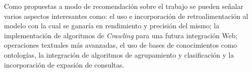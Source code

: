 Como propuestas a modo de recomendación sobre el trabajo se pueden señalar
varios aspectos interesantes como: el uso e incorporación de retroalimentación
al modelo con la cual se ganaría en rendimiento y precisión del mismo; la
implementación de algoritmos de \emph{Crawling} para una futura integración
Web; operaciones textuales más avanzadas, el uso de bases de conocimientos
como ontologías, la integración de algoritmos de agrupamiento y clasificación
y la incorporación de expasión de consultas.